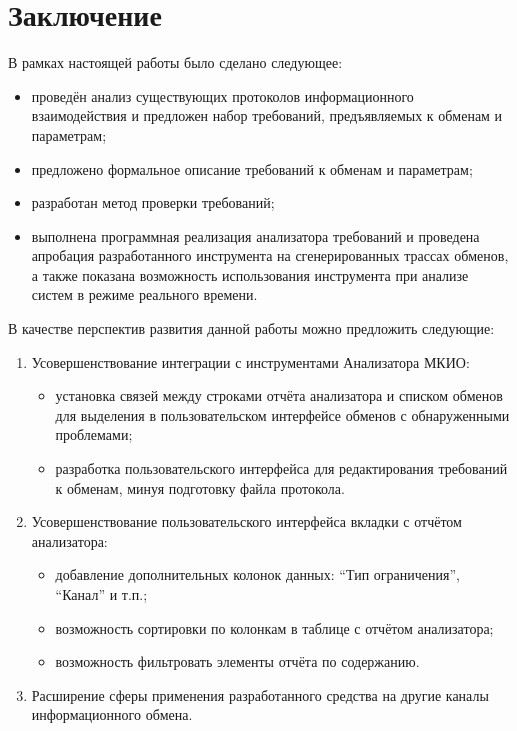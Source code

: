 \section{Заключение}

В рамках настоящей работы было сделано следующее:

\begin{itemize}
 \item проведён анализ существующих протоколов информационного взаимодействия и 
предложен набор требований, предъявляемых к обменам и параметрам;
 \item предложено формальное описание требований к обменам и параметрам;
 \item разработан метод проверки требований;
 \item выполнена программная реализация анализатора требований и 
проведена апробация разработанного инструмента на сгенерированных 
трассах обменов, а также показана возможность использования инструмента при 
анализе систем в режиме реального времени.
\end{itemize}

В качестве перспектив развития данной работы можно предложить следующие:

\begin{enumerate}
 \item Усовершенствование интеграции с  инструментами Анализатора МКИО:
 \begin{itemize}
  \item установка связей между строками отчёта анализатора и списком обменов 
для выделения в пользовательском интерфейсе обменов с обнаруженными проблемами;
  \item разработка пользовательского интерфейса для редактирования требований к 
обменам, минуя подготовку файла протокола.
 \end{itemize}
 
 \item Усовершенствование пользовательского интерфейса вкладки с отчётом 
анализатора:
 \begin{itemize}
  \item добавление дополнительных колонок данных: ``Тип ограничения'', 
``Канал'' и т.п.;
  \item возможность сортировки по колонкам в таблице с отчётом анализатора;
  \item возможность фильтровать элементы отчёта по содержанию.
 \end{itemize}

 \item Расширение сферы применения разработанного средства на другие каналы 
информационного обмена.
\end{enumerate}

